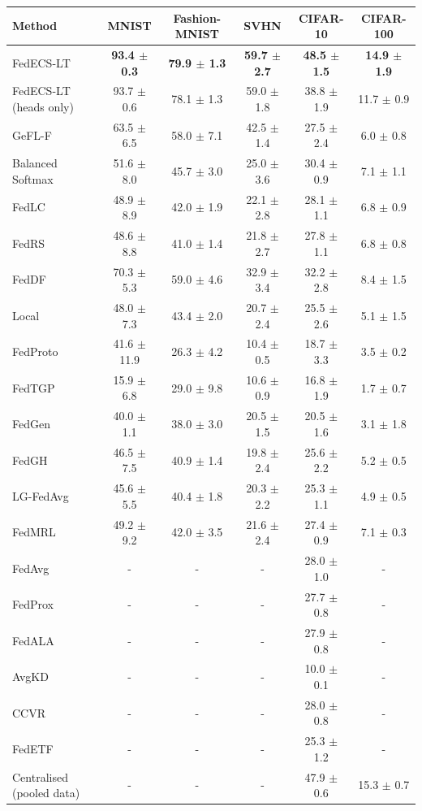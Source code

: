 \begin{tabular}{lccccc}
\toprule
Method & MNIST & Fashion-MNIST & SVHN & CIFAR-10 & CIFAR-100\\
\midrule
FedECS-LT & \textbf{93.4 $\pm$ 0.3} & \textbf{79.9 $\pm$ 1.3} & \textbf{59.7 $\pm$ 2.7} & \textbf{48.5 $\pm$ 1.5} & \textbf{14.9 $\pm$ 1.9}\\
FedECS-LT (heads only) & 93.7 $\pm$ 0.6 & 78.1 $\pm$ 1.3 & 59.0 $\pm$ 1.8 & 38.8 $\pm$ 1.9 & 11.7 $\pm$ 0.9\\
GeFL-F & 63.5 $\pm$ 6.5 & 58.0 $\pm$ 7.1 & 42.5 $\pm$ 1.4 & 27.5 $\pm$ 2.4 & 6.0 $\pm$ 0.8\\
Balanced Softmax & 51.6 $\pm$ 8.0 & 45.7 $\pm$ 3.0 & 25.0 $\pm$ 3.6 & 30.4 $\pm$ 0.9 & 7.1 $\pm$ 1.1\\
FedLC & 48.9 $\pm$ 8.9 & 42.0 $\pm$ 1.9 & 22.1 $\pm$ 2.8 & 28.1 $\pm$ 1.1 & 6.8 $\pm$ 0.9\\
FedRS & 48.6 $\pm$ 8.8 & 41.0 $\pm$ 1.4 & 21.8 $\pm$ 2.7 & 27.8 $\pm$ 1.1 & 6.8 $\pm$ 0.8\\
FedDF & 70.3 $\pm$ 5.3 & 59.0 $\pm$ 4.6 & 32.9 $\pm$ 3.4 & 32.2 $\pm$ 2.8 & 8.4 $\pm$ 1.5\\
Local & 48.0 $\pm$ 7.3 & 43.4 $\pm$ 2.0 & 20.7 $\pm$ 2.4 & 25.5 $\pm$ 2.6 & 5.1 $\pm$ 1.5\\
FedProto & 41.6 $\pm$ 11.9 & 26.3 $\pm$ 4.2 & 10.4 $\pm$ 0.5 & 18.7 $\pm$ 3.3 & 3.5 $\pm$ 0.2\\
FedTGP & 15.9 $\pm$ 6.8 & 29.0 $\pm$ 9.8 & 10.6 $\pm$ 0.9 & 16.8 $\pm$ 1.9 & 1.7 $\pm$ 0.7\\
FedGen & 40.0 $\pm$ 1.1 & 38.0 $\pm$ 3.0 & 20.5 $\pm$ 1.5 & 20.5 $\pm$ 1.6 & 3.1 $\pm$ 1.8\\
FedGH & 46.5 $\pm$ 7.5 & 40.9 $\pm$ 1.4 & 19.8 $\pm$ 2.4 & 25.6 $\pm$ 2.2 & 5.2 $\pm$ 0.5\\
LG-FedAvg & 45.6 $\pm$ 5.5 & 40.4 $\pm$ 1.8 & 20.3 $\pm$ 2.2 & 25.3 $\pm$ 1.1 & 4.9 $\pm$ 0.5\\
FedMRL & 49.2 $\pm$ 9.2 & 42.0 $\pm$ 3.5 & 21.6 $\pm$ 2.4 & 27.4 $\pm$ 0.9 & 7.1 $\pm$ 0.3\\
FedAvg & - & - & - & 28.0 $\pm$ 1.0 & -\\
FedProx & - & - & - & 27.7 $\pm$ 0.8 & -\\
FedALA & - & - & - & 27.9 $\pm$ 0.8 & -\\
AvgKD & - & - & - & 10.0 $\pm$ 0.1 & -\\
CCVR & - & - & - & 28.0 $\pm$ 0.8 & -\\
FedETF & - & - & - & 25.3 $\pm$ 1.2 & -\\
Centralised (pooled data) & - & - & - & 47.9 $\pm$ 0.6 & 15.3 $\pm$ 0.7\\
\bottomrule
\end{tabular}

